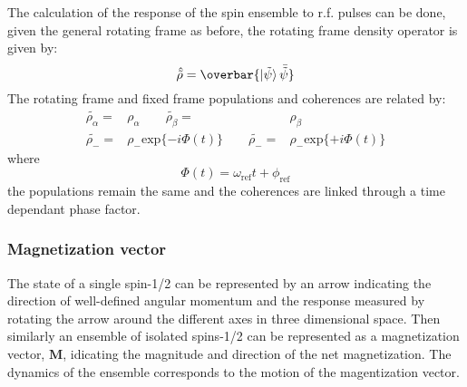 The calculation of the response of the spin ensemble to r.f. pulses can be done, given the
general rotating frame as before, the rotating frame density operator is given by:
\begin{equation}
  \hat{\tilde{\rho}} = \overbar{\ket{\tilde{\psi}}\bar{\tilde{\psi}}}
\end{equation}
The rotating frame and fixed frame populations and coherences are related by:
\begin{align}\label{eqn:DensityRotFrame}
  \tilde{\rho_\alpha} =& \rho_\alpha  \qquad \tilde{\rho_\beta} =& \rho_\beta\\
  \tilde{\rho_-} =& \rho_-\text{exp}\{-i\Phi(t)\} \qquad \tilde{\rho_-} =& \rho_-\text{exp}\{+i\Phi(t)\}
\end{align}
where
\begin{equation}
  \Phi(t) = \omega_{\text{ref}}t + \phi_{\text{ref}}
\end{equation}
the populations remain the same and the coherences are linked through a time dependant phase factor.

\subsubsection{Magnetization vector}

The state of a single spin-1/2 can be represented by an arrow indicating the direction of well-defined angular momentum and
the response measured by rotating the arrow around the different axes in three dimensional space. Then similarly
an ensemble of isolated spins-1/2 can be represented as a magnetization vector, $\mathbf{M}$, idicating the magnitude
and direction of the net magnetization. The dynamics of the ensemble corresponds to the motion of the magentization vector.

